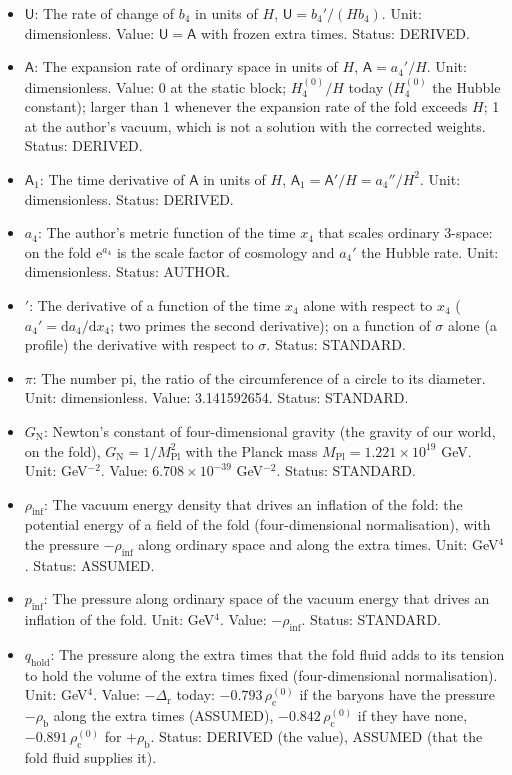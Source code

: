 \documentclass[
  10pt,
]{article}
\providecommand{\tightlist}{%
  \setlength{\itemsep}{0pt}\setlength{\parskip}{0pt}}
\begin{document}
\begin{itemize}
\tightlist
\item
  \(\mathsf{U}\): The rate of change of \(b_4\) in units of \(H\),
  \(\mathsf{U} = b_4'/(Hb_4)\). Unit: dimensionless. Value:
  \(\mathsf{U} = \mathsf{A}\) with frozen extra times. Status: DERIVED.
\item
  \(\mathsf{A}\): The expansion rate of ordinary space in units of
  \(H\), \(\mathsf{A} = a_4'/H\). Unit: dimensionless. Value: 0 at the
  static block; \(H_4^{(0)}/H\) today (\(H_4^{(0)}\) the Hubble
  constant); larger than 1 whenever the expansion rate of the fold
  exceeds \(H\); 1 at the author's vacuum, which is not a solution with
  the corrected weights. Status: DERIVED.
\item
  \(\mathsf{A}_1\): The time derivative of \(\mathsf{A}\) in units of
  \(H\), \(\mathsf{A}_1 = \mathsf{A}'/H = a_4''/H^2\). Unit:
  dimensionless. Status: DERIVED.
\item
  \(a_4\): The author's metric function of the time \(x_4\) that scales
  ordinary 3-space: on the fold \(\mathrm{e}^{a_4}\) is the scale factor
  of cosmology and \(a_4'\) the Hubble rate. Unit: dimensionless.
  Status: AUTHOR.
\item
  \({}'\): The derivative of a function of the time \(x_4\) alone with
  respect to \(x_4\) (\(a_4' = \mathrm{d}a_4/\mathrm{d}x_4\); two primes
  the second derivative); on a function of \(\sigma\) alone (a profile)
  the derivative with respect to \(\sigma\). Status: STANDARD.
\item
  \(\pi\): The number pi, the ratio of the circumference of a circle to
  its diameter. Unit: dimensionless. Value: 3.141592654. Status:
  STANDARD.
\item
  \(G_{\mathrm{N}}\): Newton's constant of four-dimensional gravity (the
  gravity of our world, on the fold),
  \(G_{\mathrm{N}} = 1/M_{\mathrm{Pl}}^2\) with the Planck mass
  \(M_{\mathrm{Pl}} = 1.221\times10^{19}\) GeV. Unit: GeV\(^{-2}\).
  Value: \(6.708\times10^{-39}\) GeV\(^{-2}\). Status: STANDARD.
\item
  \(\rho_{\mathrm{inf}}\): The vacuum energy density that drives an
  inflation of the fold: the potential energy of a field of the fold
  (four-dimensional normalisation), with the pressure
  \(-\rho_{\mathrm{inf}}\) along ordinary space and along the extra
  times. Unit: GeV\(^4\). Status: ASSUMED.
\item
  \(p_{\mathrm{inf}}\): The pressure along ordinary space of the vacuum
  energy that drives an inflation of the fold. Unit: GeV\(^4\). Value:
  \(-\rho_{\mathrm{inf}}\). Status: STANDARD.
\item
  \(q_{\mathrm{hold}}\): The pressure along the extra times that the
  fold fluid adds to its tension to hold the volume of the extra times
  fixed (four-dimensional normalisation). Unit: GeV\(^4\). Value:
  \(-\Delta_{\mathrm{r}}\) today: \(-0.793\,\rho_{\mathrm{c}}^{(0)}\) if
  the baryons have the pressure \(-\rho_{\mathrm{b}}\) along the extra
  times (ASSUMED), \(-0.842\,\rho_{\mathrm{c}}^{(0)}\) if they have
  none, \(-0.891\,\rho_{\mathrm{c}}^{(0)}\) for \(+\rho_{\mathrm{b}}\).
  Status: DERIVED (the value), ASSUMED (that the fold fluid supplies
  it).
\end{itemize}
\end{document}
